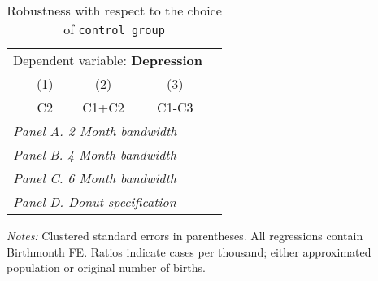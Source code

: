  \begin{table}[H] \begin{threeparttable} \centering \caption{Robustness with respect to the choice of \texttt{control group}} {\def\sym#1{\ifmmode^{#1}\else\(^{#1}\)\fi} \begin{tabular}{l*{4}{c}} \toprule \multicolumn{4}{c}{Dependent variable: \textbf{Depression}} \\ \cmidrule(lr){2-4}
            &\multicolumn{1}{c}{(1)}&\multicolumn{1}{c}{(2)}&\multicolumn{1}{c}{(3)}\\
            &\multicolumn{1}{c}{C2}&\multicolumn{1}{c}{C1+C2}&\multicolumn{1}{c}{C1-C3}\\
\midrule
 \multicolumn{4}{l}{\emph{Panel A. 2 Month bandwidth}} \\    \midrule\multicolumn{4}{l}{\emph{Panel B. 4 Month bandwidth}} \\    \midrule\multicolumn{4}{l}{\emph{Panel C. 6 Month bandwidth}} \\    \midrule\multicolumn{4}{l}{\emph{Panel D. Donut specification}} \\    
\bottomrule \end{tabular} } \begin{tablenotes} \item \scriptsize \emph{Notes:} Clustered standard errors in parentheses. All regressions contain Birthmonth FE. Ratios indicate cases per thousand; either approximated population or original number of births. \end{tablenotes} \end{threeparttable} \end{table} 
